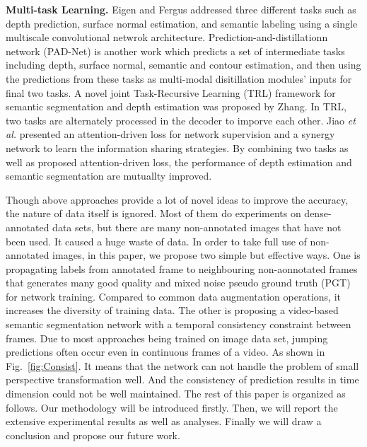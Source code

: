 {\bf Multi-task Learning.} 
%
Eigen and Fergus \cite{Eigen2015} addressed three different tasks such as depth prediction, surface normal estimation, and semantic labeling using a single multiscale convolutional netwrok architecture. 
%
Prediction-and-distillationn network (PAD-Net) is another work\cite{Xu2018} which predicts a set of intermediate tasks including depth, surface normal, semantic and contour estimation, and then using the predictions from these tasks as multi-modal disitillation modules' inputs for final two tasks.  
%
A novel joint Task-Recursive Learning (TRL) \cite{Zhang2018} framework for semantic segmentation and depth estimation was proposed by Zhang. 
%
In TRL, two tasks are alternately processed in the decoder to imporve each other.
% 
Jiao \emph{et al.} \cite{Jiao2018} presented an attention-driven loss for network supervision and a synergy network to learn the information sharing strategies. 
%
By combining two tasks as well as proposed attention-driven loss, the performance of depth estimation and semantic segmentation are mutuallty improved.

Though above approaches provide a lot of novel ideas to improve the accuracy, the nature of data itself is ignored. 
%
Most of them do experiments on dense-annotated data sets, but there are many non-annotated images that have not been used.
%
It caused a huge waste of data.
%
In order to take full use of non-annotated images, in this paper, we propose two simple but effective ways. 
%
One is propagating labels from annotated frame to neighbouring non-aonnotated frames that generates many good quality and mixed noise pseudo ground truth (PGT) for network training. 
%
Compared to common data augmentation operations, it increases the diversity of training data.
%
The other is proposing a video-based semantic segmentation network with a temporal consistency constraint between frames. 
%
Due to most approaches being trained on image data set, jumping predictions often occur even in continuous frames of a video. 
%
As shown in Fig.~\ref{fig:Consist}.
%
It means that the network can not handle the problem of small perspective transformation well.
%
And the consistency of prediction results in time dimension could not be well maintained.
%
The rest of this paper is organized as follows.
% 
Our methodology will be introduced firstly.
%
Then, we will report the extensive experimental results as well as analyses. 
%
Finally we will draw a conclusion and propose our future work.
